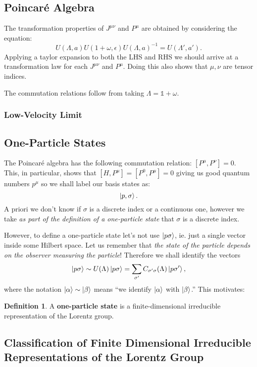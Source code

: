 \documentclass[10pt]{article}
\newcommand{\iden}{\mathds{1}}
\newcommand{\sg}{\sigma}
\theoremstyle{plain}
\theoremstyle{definition}
\newtheorem{defn}{Definition}
\theoremstyle{remark}
\newcommand{\om}{\omega}
\begin{document}
\subsection{Poincar\'e Algebra}
The transformation properties of $J^{\mu\nu}$ and $P^\mu$ are obtained by
considering the equation:
\[ U(\Lambda,a)U(1+\om,\epsilon)U(\Lambda,a)^{-1} = U(\Lambda', a').\]
Applying a taylor expansion to both the LHS and RHS we should arrive at a
transformation law for each $J^{\mu\nu}$ and $P^\mu$. Doing this also
shows that $\mu,\nu$ are tensor indices.

The commutation relations follow from taking $\Lambda =\iden+\om$.

\subsubsection{Low-Velocity Limit}

\subsection{One-Particle States}
The Poincar\'e algebra has the following commutation relation:
$[P^\mu,P^\nu]=0$.  This, in particular, shows that
$[H,P^\mu]=[P^0,P^\mu]=0$ giving us good quantum numbers $p^\mu$ so we
shall label our basis states as:  \[ \ket{p,\sg}. \] A priori we don't
know  if $\sg$ is a discrete index or a continuous one, however we
take \emph{as part of the definition of a one-particle state} that
$\sg$ is a discrete index.

However, to define a one-particle state let's not use $\ket{p\sg}$,
ie.  just a single vector inside some Hilbert space. Let us remember
that \emph{the state of the particle depends on the observer measuring
the particle}! Therefore we shall identify the vectors \[\ket{p\sg}
\sim U(\Lambda)\ket{p\sg} = \sum_{\sg'} C_{\sg'\sg} (\Lambda)
\ket{p\sg'},\] where the notation $\ket\alpha\sim\ket\beta$ means ``we 
identify $\ket\alpha$ with $\ket\beta$.'' This motivates:
\begin{defn} A \textbf{one-particle state} is a finite-dimensional
    irreducible representation of the Lorentz group.
\end{defn}

\subsection{Classification of Finite Dimensional Irreducible
Representations of the Lorentz Group}
\end{document}
